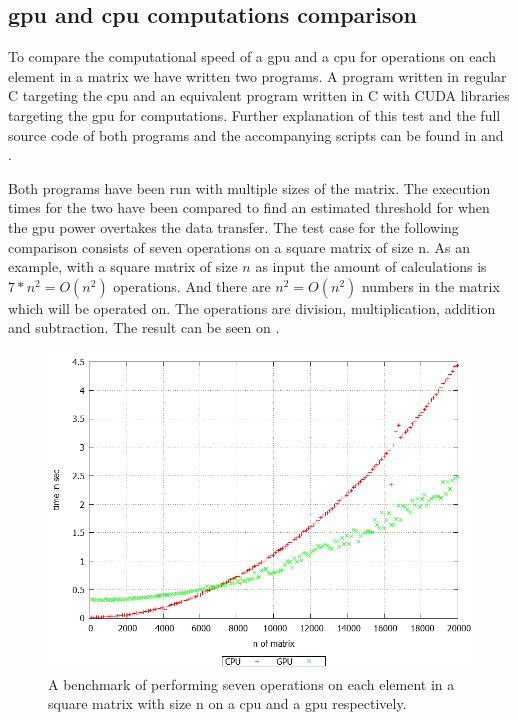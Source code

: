 \subsection{\acrshort{gpu} and \acrshort{cpu} computations comparison}\label{sub:gpubechmark}
To compare the computational speed of a \acrshort{gpu} and a \acrshort{cpu} for operations on each element in a matrix we have written two programs.
A program written in regular C targeting the \acrshort{cpu} and an equivalent program written in C with CUDA libraries targeting the \acrshort{gpu} for computations.
Further explanation of this test and the full source code of both programs and the accompanying scripts can be found in  and .

Both programs have been run with multiple sizes of the matrix.
The execution times for the two have been compared to find an estimated threshold for when the \acrshort{gpu} power overtakes the data transfer.
The test case for the following comparison consists of seven operations on a square matrix of size n.
As an example, with a square matrix of size $n$ as input the amount of calculations is $7*n^2 = O(n^2)$ operations. 
And there are $n^2 = O(n^2)$ numbers in the matrix which will be operated on.
The operations are division, multiplication, addition and subtraction.
The result can be seen on .
\begin{figure}[h!]
\centering
 \includegraphics[width=1\textwidth]{figures/benchmark.png} %
\caption{A benchmark of performing seven operations on each element in a square matrix with size n on a \acrshort{cpu} and a \acrshort{gpu} respectively.}\label{image:benchmark}
\vspace{-15pt}
\end{figure}

